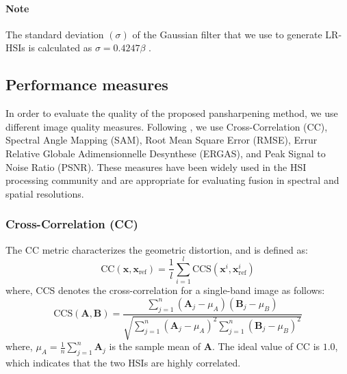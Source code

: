 \documentclass[journal]{IEEEtran}
\begin{document}
        \paragraph*{Note} The standard deviation $(\sigma)$ of the Gaussian filter that we use to generate LR-HSIs is calculated as $\sigma = 0.4247 \beta $ \cite{Panshaperpening_wei_thesis}. 
        
    \subsection{Performance measures}
    In order to evaluate the quality of the proposed pansharpening method, we use different image quality measures. Following \cite{DHP-DARN}, we use Cross-Correlation (CC), Spectral Angle Mapping (SAM), Root Mean Square Error (RMSE), Errur Relative Globale Adimensionnelle Desynthese (ERGAS), and Peak Signal to Noise Ratio (PSNR). These measures have been widely used in the HSI processing community and are appropriate for evaluating  fusion in spectral and spatial resolutions.
    
\subsubsection{Cross-Correlation (CC)} The CC metric characterizes the geometric distortion, and is defined as:
    \begin{equation}
        \text{CC}(\mathbf{x}, \mathbf{x}_{\text{ref}}) = \frac{1}{l} \sum_{i=1}^{l} \text{CCS}(\mathbf{x}^{i}, \mathbf{x}_{\text{ref}}^{i})
    \end{equation}
    where, CCS denotes the cross-correlation for a single-band image as follows:
    \begin{equation}
        \text{CCS}(\mathbf{A}, \mathbf{B}) = \frac{\sum_{j=1}^{n} (\mathbf{A}_j - \mu_A)(\mathbf{B}_j - \mu_B)}{\sqrt{\sum_{j=1}^{n} (\mathbf{A}_j - \mu_A)^2\sum_{j=1}^{n}(\mathbf{B}_j-\mu_B)^2}}
    \end{equation}
    where, $\mu_A = \frac{1}{n} \sum_{j=1}^{n} \mathbf{A}_j$ is the sample mean of $\mathbf{A}$. The ideal value of CC is $1.0$, which indicates that the two HSIs are highly correlated.
    
\end{document}
